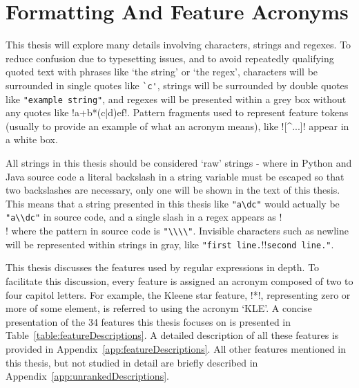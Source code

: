 \section{Formatting And Feature Acronyms}
This thesis will explore many details involving characters, strings and regexes.  To reduce confusion due to typesetting issues, and to avoid repeatedly qualifying quoted text with phrases like `the string' or `the regex', characters will be surrounded in single quotes like \verb!`c'!, strings will be surrounded by double quotes like \verb!"example string"!, and regexes will be presented within a grey box without any quotes like \cverb!a+b*(c|d)e\1f!.  Pattern fragments used to represent feature tokens (usually to provide an example of what an acronym means), like \fverb![^...]! appear in a white box.

All strings in this thesis should be considered `raw' strings - where in Python and Java source code a literal backslash in a string variable must be escaped so that two backslashes are necessary, only one will be shown in the text of this thesis.  This means that a string presented in this thesis like \verb!"a\dc"! would actually be \verb!"a\\dc"! in source code, and a single slash in a regex appears as \cverb!\\! where the pattern in source code is \verb!"\\\\"!.  Invisible characters such as newline will be represented within strings in gray, like \verb!"first line.!\gverb!\n!\verb!second line."!.

This thesis discusses the features used by regular expressions in depth.  To facilitate this discussion, every feature is assigned an acronym composed of two to four capitol letters.  For example, the Kleene star feature, \fverb!*!, representing zero or more of some element, is referred to using the acronym `KLE'.  A concise presentation of the 34 features this thesis focuses on is presented in Table~\ref{table:featureDescriptions}.  A detailed description of all these features is provided in Appendix~\ref{app:featureDescriptions}.  All other features mentioned in this thesis, but not studied in detail are briefly described in Appendix~\ref{app:unrankedDescriptions}.
